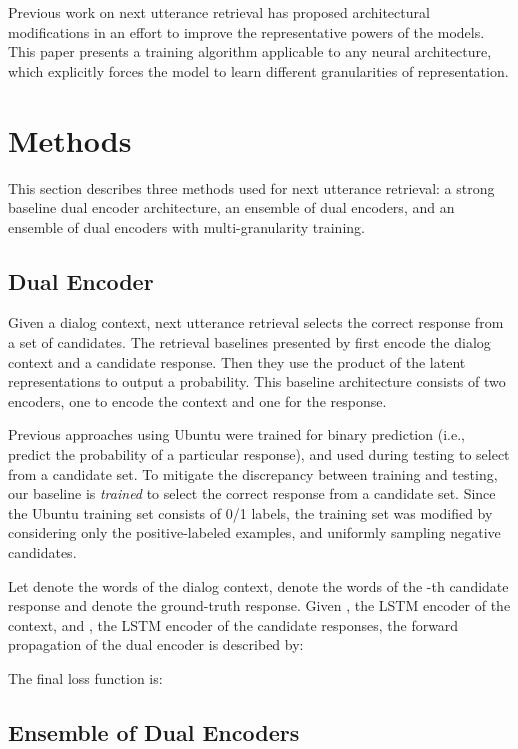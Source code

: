 \documentclass[11pt,a4paper]{article}
\begin{document}
Previous work on next utterance retrieval has proposed architectural modifications in an effort to improve the representative powers of the models. This paper presents a training algorithm applicable to any neural architecture, which explicitly forces the model to learn different granularities of representation. 

\section{Methods}

This section describes three methods used for next utterance retrieval: a strong baseline dual encoder architecture, an ensemble of dual encoders, and an ensemble of dual encoders with multi-granularity training. 


\subsection{Dual Encoder}

Given a dialog context, next utterance retrieval selects the correct response from a set of  candidates. The retrieval baselines presented by \citet{kadlec2015improved} first encode the dialog context and a candidate response. Then they use the product of the latent representations to output a probability. This baseline architecture consists of two encoders, one to encode the context and one for the response. 

Previous approaches using Ubuntu were trained for binary prediction (i.e., predict the probability of a particular response), and used during testing to select from a candidate set. To mitigate the discrepancy between training and testing, our baseline is \textit{trained} to select the correct response from a candidate set. Since the Ubuntu training set consists of 0/1 labels, the training set was modified by considering only the positive-labeled examples, and uniformly sampling  negative candidates. 

Let  denote the words of the dialog context,  denote the words of the -th candidate response and  denote the ground-truth response. Given , the LSTM encoder of the context, and , the LSTM encoder of the candidate responses, the forward propagation of the dual encoder is described by:



The final loss function is:




\subsection{Ensemble of Dual Encoders}
\end{document}
